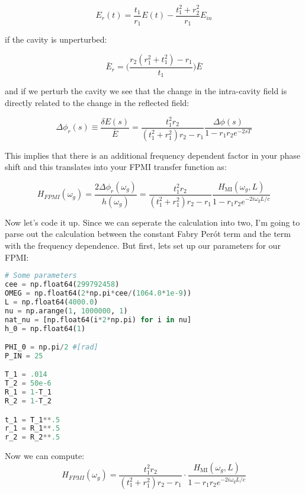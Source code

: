 \begin{equation} E_r(t) = \frac{t_1}{r_1}E(t) - \frac{t_1^2 + r_2^2}{r_1} E_{in}\end{equation}

if the cavity is unperturbed:

\begin{equation} \bar{E}_r = \bigg(\frac{r_2(r_1^2 + t_1^2) - r_1}{t_1} \bigg) \bar{E} \end{equation}

and if we perturb the cavity we see that the change in the intra-cavity
field is directly related to the change in the reflected field:

\begin{equation} \Delta \phi_r(s) \equiv \frac{\delta E(s)}{\bar{E}} = \frac{t_1^2r_2}{(t_1^2 + r_1^2)r_2 -r_1} \frac{\Delta \phi(s)}{1-r_1r_2e^{-2sT}}\end{equation}

This implies that there is an additional frequency dependent factor in
your phase shift and this translates into your FPMI transfer function
as:

\begin{equation} H_{FPMI}(\omega_g) = \frac{2 \Delta \phi_r(\omega_g)}{h(\omega_g)} =  \frac{t_1^2r_2}{(t_1^2 + r_1^2)r_2 -r_1} \frac{H_{\mathrm{MI}}(\omega_g, L)}{1-r_1r_2e^{-2i \omega_g L /c }}  \end{equation}

Now let's code it up. Since we can seperate the calculation into two, I'm going to parse out the
calculation between the constant Fabry Perót term and the term with the frequency dependence. But first, lets set up our parameters for our FPMI:

\begin{spacing}{1.2} \begin{lstlisting}[frame=single, language=Python]
# Some parameters
cee = np.float64(299792458)
OMEG = np.float64(2*np.pi*cee/(1064.0*1e-9))
L = np.float64(4000.0)
nu = np.arange(1, 1000000, 1)
nat_nu = [np.float64(i*2*np.pi) for i in nu]
h_0 = np.float64(1)

PHI_0 = np.pi/2 #[rad]
P_IN = 25

T_1 = .014
T_2 = 50e-6
R_1 = 1-T_1
R_2 = 1-T_2

t_1 = T_1**.5
r_1 = R_1**.5
r_2 = R_2**.5
\end{lstlisting} \end{spacing}

\noindent Now we can compute:
\begin{equation} H_{FPMI}(\omega_g) =  \frac{t_1^2r_2}{(t_1^2 + r_1^2)r_2 -r_1}\cdot \frac{H_{\mathrm{MI}}(\omega_g, L)}{1-r_1r_2e^{-2i \omega_g L /c }}  \end{equation}


